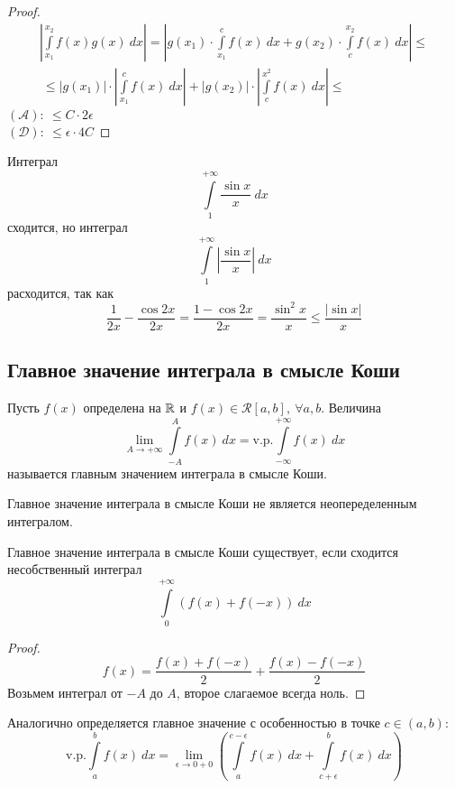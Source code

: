 \begin{proof}
    \begin{multline*}
        \left|\int\limits_{x_1}^{x_2}f(x)g(x)\ dx\right|=\left|g(x_1)\cdot \int\limits_{x_1}^{c}f(x)\ dx+g(x_2)\cdot \int\limits_{c}^{x_2}f(x)\ dx\right|\leq\\\
        \leq |g(x_1)|\cdot \left|\int\limits_{x_1}^{c}f(x)\ dx\right|+|g(x_2)|\cdot \left|\int\limits_{c}^{x^2}f(x)\ dx\right|\leq
    \end{multline*} 
    $(\mathcal{A}):\ \leq C\cdot 2\epsilon$\\
    $(\mathcal{D}):\ \leq \epsilon \cdot 4C$
\end{proof} 
\begin{example} Интеграл 
    \[\int\limits_{1}^{+\infty}\frac{\sin{x}}{x}\ dx\]
    сходится, но интеграл
    \[\int\limits_{1}^{+\infty}\left|\frac{\sin{x}}{x}\right|\ dx\]
    расходится, так как
    \[\frac{1}{2x}-\frac{\cos{2x}}{2x}=\frac{1-\cos{2x}}{2x}=\frac{\sin^2{x}}{x}\leq \frac{|\sin{x}|}{x}\]
\end{example}
\subsection{Главное значение интеграла в смысле Коши}
\begin{definition}
    Пусть $f(x)$ определена на $\mathbb{R}$ и $f(x)\in \mathcal{R}[a,b],\ \forall a,b$. Величина
    \[\lim\limits_{A\to +\infty}\int\limits_{-A}^{A}f(x)\ dx=\text{v.p.} \int\limits_{-\infty}^{+\infty}f(x)\ dx\]
    называется главным значением интеграла в смысле Коши. %
\end{definition} 
\begin{comm}
    Главное значение интеграла в смысле Коши не является неопеределенным интегралом.
\end{comm} 
\begin{theorem}
    Главное значение интеграла в смысле Коши существует, если сходится несобственный интеграл
    \[\int\limits_{0}^{+\infty}(f(x)+f(-x))\ dx\]
\end{theorem} 
\begin{proof}
    \[f(x)=\frac{f(x)+f(-x)}{2}+\frac{f(x)-f(-x)}{2}\]
    Возьмем интеграл от $-A$ до $A$, второе слагаемое всегда ноль.
\end{proof} 
\begin{comm}
    Аналогично определяется главное значение с особенностью в точке $c\in (a,b)$:
    \[\text{v.p.}\int\limits_{a}^{b}f(x)\ dx=\lim\limits_{\epsilon\to 0+0}\left(\int\limits_{a}^{c-\epsilon}f(x)\ dx+\int\limits_{c+\epsilon}^{b}f(x)\ dx\right)\]
\end{comm} 